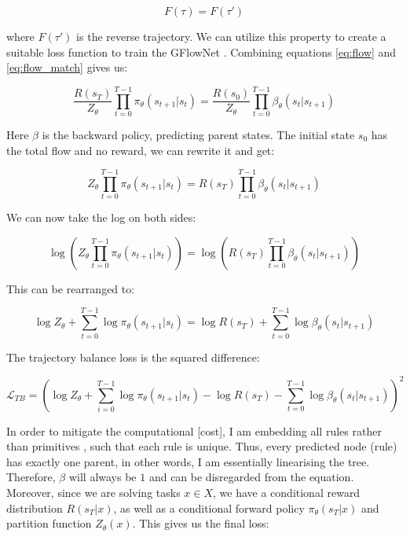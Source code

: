 \begin{equation} \label{eq:flow_match}
    F(\tau) = F(\tau')
\end{equation}

where \( F(\tau') \) is the reverse trajectory.
We can utilize this property to create a suitable loss function to train the GFlowNet \cite{malkin_trajectory_2022}. Combining equations \ref{eq:flow} and \ref{eq:flow_match} gives us:

\begin{equation}
    \frac{R(s_T)}{Z_\theta} \prod_{t=0}^{T-1} \pi_\theta(s_{t+1} | s_{t}) = \frac{R(s_0)}{Z_\theta} \prod_{t=0}^{T-1} \beta_\theta(s_{t} | s_{t+1})
\end{equation}

Here \( \beta \) is the backward policy, predicting parent states. 
The initial state \(s_0\) has the total flow and no reward, we can rewrite it and get:

\begin{equation}
    Z_{\theta} \prod_{t=0}^{T-1} \pi_\theta(s_{t+1} | s_{t}) = R(s_T) \prod_{t=0}^{T-1} \beta_\theta(s_{t} | s_{t+1})
\end{equation}

We can now take the log on both sides:

\begin{equation}
    \log \left(Z_{\theta} \prod_{t=0}^{T-1} \pi_\theta(s_{t+1} | s_{t})\right) = \log \left(R(s_T) \prod_{t=0}^{T-1} \beta_\theta(s_{t} | s_{t+1})\right)
\end{equation}

This can be rearranged to:

\begin{equation}
    \log Z_\theta + \sum_{t=0}^{T-1} \log \pi_\theta(s_{t+1}|s_{t}) = \log R(s_T) + \sum_{t=0}^{T-1} \log \beta_\theta(s_{t}|s_{t+1})
\end{equation}

The trajectory balance loss is the squared difference:

\begin{equation}
    \mathcal{L}_{TB} = \left(\log Z_\theta + \sum_{i=0}^{T-1} \log \pi_\theta(s_{t+1}|s_{t}) - \log R(s_T) - \sum_{t=0}^{T-1} \log \beta_\theta(s_{t}|s_{t+1})\right)^2
\end{equation}

In order to mitigate the computational [cost], I am embedding all rules rather than primitives , such that each rule is unique. Thus, every predicted node (rule) has exactly one parent, in other words, I am essentially linearising the tree. Therefore, $\beta$ will always be $1$ and can be disregarded from the equation.
Moreover, since we are solving tasks \( x \in X \), we have a conditional reward distribution $R(s_T|x)$, as well as a conditional forward policy $\pi_\theta(s_T|x)$ and partition function $Z_\theta(x)$.
This gives us the final loss:


